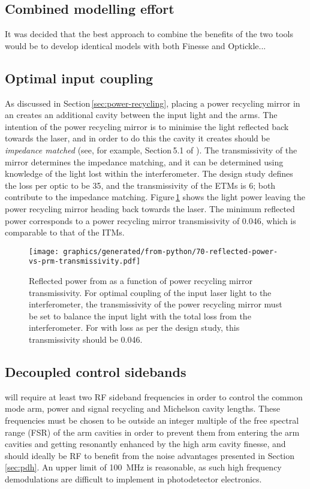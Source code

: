 \subsection{Combined modelling effort}
It was decided that the best approach to combine the benefits of the two tools would be to develop identical models with both Finesse and Optickle...

\subsection{Optimal input coupling}
As discussed in Section\,\ref{sec:power-recycling}, placing a power recycling mirror in an \MI{} creates an additional cavity between the input light and the arms. The intention of the power recycling mirror is to minimise the light reflected back towards the laser, and in order to do this the cavity it creates should be \emph{impedance matched} (see, for example, Section\,5.1 of \cite{Freise2010}). The transmissivity of the mirror determines the impedance matching, and it can be determined using knowledge of the light lost within the interferometer. The design study defines the loss per optic to be \SI{35}{\ppm}, and the transmissivity of the \glspl{ETM} is \SI{6}{\ppm}; both contribute to the impedance matching. Figure\,\ref{fig:reflected-power-vs-prm-trans} shows the light power leaving the power recycling mirror heading back towards the laser. The minimum reflected power corresponds to a power recycling mirror transmissivity of \num{0.046}, which is comparable to that of the \glspl{ITM}.

\begin{figure}
  \centering
  \texttt{[image: graphics/generated/from-python/70-reflected-power-vs-prm-transmissivity.pdf]}
  \caption[Reflected power from \ETLF{} as a function of power recycling mirror transmissivity]{\label{fig:reflected-power-vs-prm-trans}Reflected power from \ETLF{} as a function of power recycling mirror transmissivity. For optimal coupling of the input laser light to the interferometer, the transmissivity of the power recycling mirror must be set to balance the input light with the total loss from the interferometer. For \ETLF{} with loss as per the design study, this transmissivity should be \num{0.046}.}
\end{figure}

\subsection{Decoupled control sidebands}
\ETLF{} will require at least two \gls{RF} sideband frequencies in order to control the common mode arm, power and signal recycling and Michelson cavity lengths. These frequencies must be chosen to be outside an integer multiple of the free spectral range (\gls{FSR}) of the arm cavities in order to prevent them from entering the arm cavities and getting resonantly enhanced by the high arm cavity finesse, and should ideally be \gls{RF} to benefit from the noise advantages presented in Section\,\ref{sec:pdh}. An upper limit of \SI{100}{\mega\hertz} is reasonable, as such high frequency demodulations are difficult to implement in photodetector electronics.

